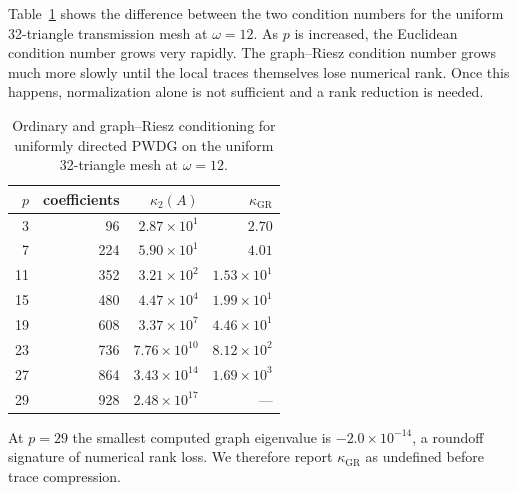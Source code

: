 \documentclass[pdflatex,sn-mathphys-num]{sn-jnl}
\theoremstyle{thmstyleone}
\theoremstyle{thmstyletwo}
\newcommand{\GR}{\mathrm{GR}}
\begin{document}
Table~\ref{tab:uniform-conditioning} shows the difference between the two condition numbers for the uniform 32-triangle transmission mesh at $\omega=12$.  As $p$ is increased, the Euclidean condition number grows very rapidly.  The graph--Riesz condition number grows much more slowly until the local traces themselves lose numerical rank.  Once this happens, normalization alone is not sufficient and a rank reduction is needed.
\begin{table}[htbp]
\centering
\caption{Ordinary and graph--Riesz conditioning for uniformly directed PWDG on the uniform 32-triangle mesh at $\omega=12$.}
\label{tab:uniform-conditioning}
\begin{tabular}{|r|r|r|r|}
\hline
$p$ & coefficients & $\kappa_2(A)$ & $\kappa_{\GR}$\\
\hline
3  &  96 & $2.87\times10^{1}$  & $2.70$\\
7  & 224 & $5.90\times10^{1}$  & $4.01$\\
11 & 352 & $3.21\times10^{2}$  & $1.53\times10^{1}$\\
15 & 480 & $4.47\times10^{4}$  & $1.99\times10^{1}$\\
19 & 608 & $3.37\times10^{7}$  & $4.46\times10^{1}$\\
23 & 736 & $7.76\times10^{10}$ & $8.12\times10^{2}$\\
27 & 864 & $3.43\times10^{14}$ & $1.69\times10^{3}$\\
29 & 928 & $2.48\times10^{17}$ & ---\\
\hline
\end{tabular}
\end{table}
At $p=29$ the smallest computed graph eigenvalue is $-2.0\times10^{-14}$, a roundoff signature of numerical rank loss.  We therefore report $\kappa_{\GR}$ as undefined before trace compression.
\end{document}
